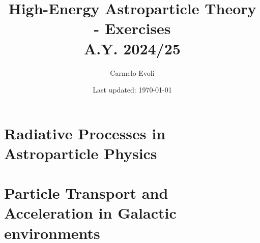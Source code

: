 \documentclass[letterpaper, 11pt, notitlepage]{report}
\begin{document}
\title{High-Energy Astroparticle Theory - {\color{blue}Exercises} \\[1em]
\normalsize A.Y. 2024/25}

\author{\normalsize Carmelo Evoli}
\date{\normalsize\vspace{-1ex} Last updated: \today}

\maketitle

\tableofcontents\label{sec:contents}

\newpage

\chapter{Radiative Processes in Astroparticle Physics} 











\chapter{Particle Transport and Acceleration in Galactic environments}






%
%
%
%



\end{document}
